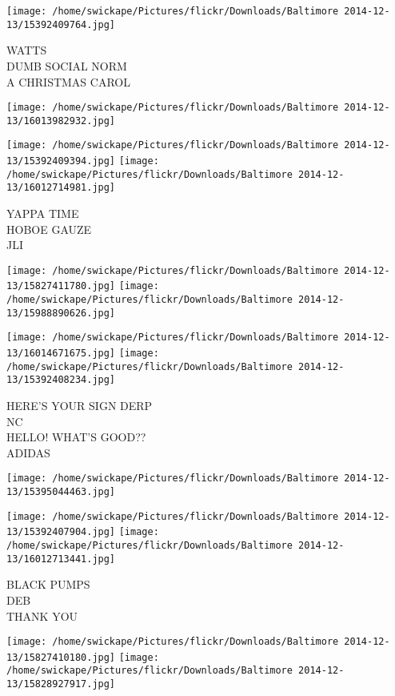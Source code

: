 \documentclass[10pt,letterpaper]{article}
\begin{document}
\texttt{[image: /home/swickape/Pictures/flickr/Downloads/Baltimore 2014-12-13/15392409764.jpg]}

WATTS\\
DUMB SOCIAL NORM\\
A CHRISTMAS CAROL
\pagebreak

\texttt{[image: /home/swickape/Pictures/flickr/Downloads/Baltimore 2014-12-13/16013982932.jpg]}

\vspace{0.25in}
\texttt{[image: /home/swickape/Pictures/flickr/Downloads/Baltimore 2014-12-13/15392409394.jpg]}
\texttt{[image: /home/swickape/Pictures/flickr/Downloads/Baltimore 2014-12-13/16012714981.jpg]}

YAPPA TIME\\
HOBOE GAUZE\\
JLI
\pagebreak

\texttt{[image: /home/swickape/Pictures/flickr/Downloads/Baltimore 2014-12-13/15827411780.jpg]}
\texttt{[image: /home/swickape/Pictures/flickr/Downloads/Baltimore 2014-12-13/15988890626.jpg]}

\texttt{[image: /home/swickape/Pictures/flickr/Downloads/Baltimore 2014-12-13/16014671675.jpg]}
\texttt{[image: /home/swickape/Pictures/flickr/Downloads/Baltimore 2014-12-13/15392408234.jpg]}

HERE'S YOUR SIGN DERP\\
NC\\
HELLO!  WHAT'S GOOD??\\
ADIDAS
\pagebreak

\texttt{[image: /home/swickape/Pictures/flickr/Downloads/Baltimore 2014-12-13/15395044463.jpg]}

\vspace{0.25in}
\texttt{[image: /home/swickape/Pictures/flickr/Downloads/Baltimore 2014-12-13/15392407904.jpg]}
\texttt{[image: /home/swickape/Pictures/flickr/Downloads/Baltimore 2014-12-13/16012713441.jpg]}

BLACK PUMPS\\
DEB\\
THANK YOU
\pagebreak

\texttt{[image: /home/swickape/Pictures/flickr/Downloads/Baltimore 2014-12-13/15827410180.jpg]}
\texttt{[image: /home/swickape/Pictures/flickr/Downloads/Baltimore 2014-12-13/15828927917.jpg]}
\end{document}

